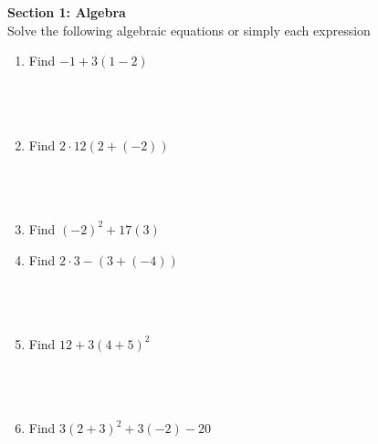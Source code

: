 \documentclass{article}
\begin{document}
\noindent
\textbf{Section 1: Algebra}
\\
Solve the following algebraic equations or simply each expression
\\
\begin{minipage}[t]{0.45\textwidth}
    \begin{enumerate}
        \item Find $-1 + 3(1-2)$
        \\\\\\\\
        \item Find $ 2 \cdot 12(2 + (-2))$
        \\\\\\\\
        \item Find $(-2)^2 + 17(3)$
        
    \end{enumerate}
\end{minipage}%
\hfill
\begin{minipage}[t]{0.45\textwidth}
    \begin{enumerate}
        \setcounter{enumi}{3} %
        \item Find $2 \cdot 3 - (3 + (-4))$
        \\\\\\\\
        \item Find $12 + 3(4+5)^2$
        \\\\\\\\
        \item Find $3(2+3)^2 +3(-2)-20$

    \end{enumerate}
\end{minipage}
\end{document}
